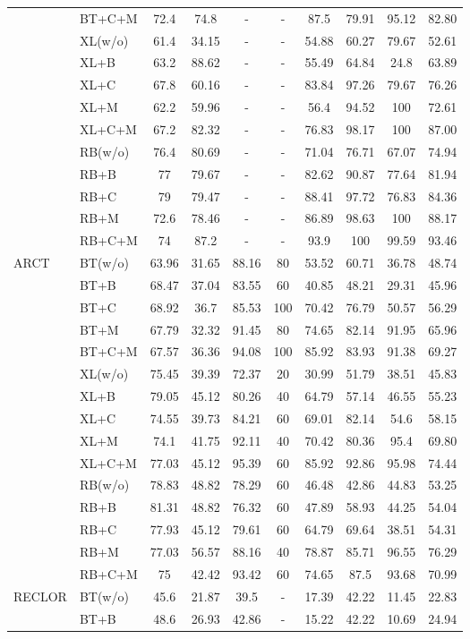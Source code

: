\documentclass[11pt,a4paper]{article}
\begin{document}
\begin{table}[th]
\begin{tabular}{ll|c|ccccccc}
&BT+C+M&72.4&74.8&-&-&87.5&79.91&95.12&82.80 \\
\cline{2-10}
&XL(w/o)&61.4&34.15&-&-&54.88&60.27&79.67&52.61 \\
&XL+B&63.2&88.62&-&-&55.49&64.84&24.8&63.89 \\
&XL+C&67.8&60.16&-&-&83.84&97.26&79.67&76.26 \\
&XL+M&62.2&59.96&-&-&56.4&94.52&100&72.61 \\
&XL+C+M&67.2&82.32&-&-&76.83&98.17&100&87.00 \\
\cline{2-10}
&RB(w/o)&76.4&80.69&-&-&71.04&76.71&67.07&74.94 \\
&RB+B&77&79.67&-&-&82.62&90.87&77.64&81.94 \\
&RB+C&79&79.47&-&-&88.41&97.72&76.83&84.36 \\
&RB+M&72.6&78.46&-&-&86.89&98.63&100&88.17 \\
&RB+C+M&74&87.2&-&-&93.9&100&99.59&93.46 \\
	\hline
\multirow{15}{*}{ARCT} 
&BT(w/o)&63.96&31.65&88.16&80&53.52&60.71&36.78&48.74 \\
&BT+B&68.47&37.04&83.55&60&40.85&48.21&29.31&45.96 \\
&BT+C&68.92&36.7&85.53&100&70.42&76.79&50.57&56.29 \\
&BT+M&67.79&32.32&91.45&80&74.65&82.14&91.95&65.96 \\
&BT+C+M&67.57&36.36&94.08&100&85.92&83.93&91.38&69.27 \\
\cline{2-10} 
&XL(w/o)&75.45&39.39&72.37&20&30.99&51.79&38.51&45.83 \\
&XL+B&79.05&45.12&80.26&40&64.79&57.14&46.55&55.23 \\
&XL+C&74.55&39.73&84.21&60&69.01&82.14&54.6&58.15 \\
&XL+M&74.1&41.75&92.11&40&70.42&80.36&95.4&69.80 \\
&XL+C+M&77.03&45.12&95.39&60&85.92&92.86&95.98&74.44 \\
\cline{2-10} 
&RB(w/o)&78.83&48.82&78.29&60&46.48&42.86&44.83&53.25 \\
&RB+B&81.31&48.82&76.32&60&47.89&58.93&44.25&54.04 \\
&RB+C&77.93&45.12&79.61&60&64.79&69.64&38.51&54.31 \\
&RB+M&77.03&56.57&88.16&40&78.87&85.71&96.55&76.29 \\
&RB+C+M&75&42.42&93.42&60&74.65&87.5&93.68&70.99 \\
	\hline
\multirow{15}{*}{RECLOR} 
&BT(w/o)&45.6&21.87&39.5&-&17.39&42.22&11.45&22.83 \\
&BT+B&48.6&26.93&42.86&-&15.22&42.22&10.69&24.94 \\

\end{tabular}
\end{table}
\end{document}
